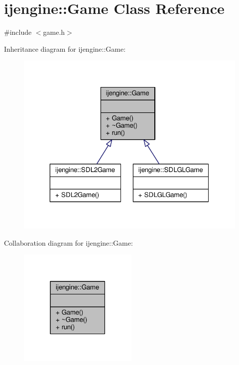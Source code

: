\hypertarget{classijengine_1_1Game}{\section{ijengine\-:\-:Game Class Reference}
\label{classijengine_1_1Game}
}


{\ttfamily \#include $<$game.\-h$>$}



Inheritance diagram for ijengine\-:\-:Game\-:\nopagebreak
\begin{figure}[H]
\begin{center}
\leavevmode
\includegraphics[width=319pt]{classijengine_1_1Game__inherit__graph}
\end{center}
\end{figure}


Collaboration diagram for ijengine\-:\-:Game\-:\nopagebreak
\begin{figure}[H]
\begin{center}
\leavevmode
\includegraphics[width=162pt]{classijengine_1_1Game__coll__graph}
\end{center}
\end{figure}
